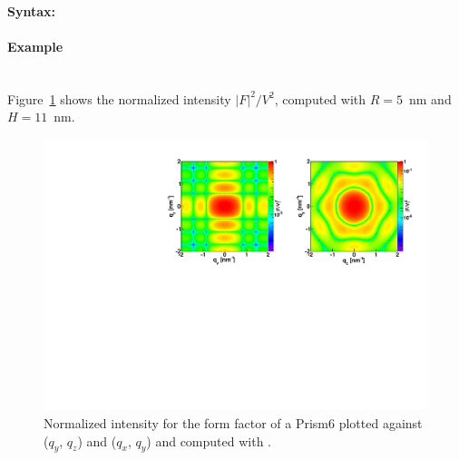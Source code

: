 \paragraph{Syntax:}  

\newpage

\paragraph{Example}\mbox{}\\
Figure~\ref{fig:FFprism6Ex} shows the normalized intensity
$|F|^2/V^2$, computed with $R=5$~nm and \mbox{$H=11$~nm.}

\begin{figure}[ht]
\begin{center}
\includegraphics[angle=-90,width=\textwidth]{Figures/ff/figffprism6.pdf}
\end{center}
\caption{Normalized intensity for the form factor of a Prism6 plotted against ($q_y$, $q_z$) and ($q_x$, $q_y$) and computed with .}
\label{fig:FFprism6Ex}
\end{figure}



